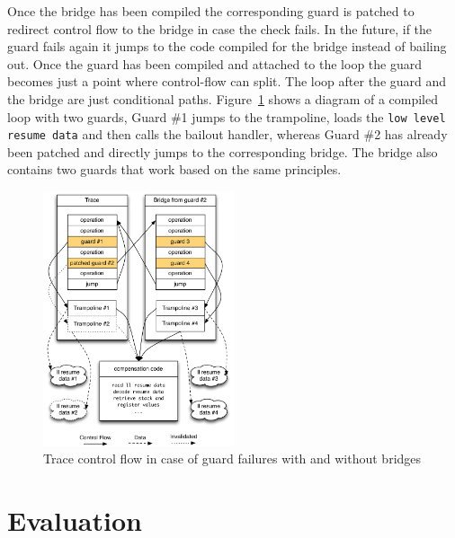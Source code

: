 \documentclass[10pt,preprint]{sigplanconf}
\begin{document}
Once the bridge has been compiled the corresponding guard is
patched to redirect control flow to the bridge in case the check fails. In
the future, if the guard fails again it jumps to the code compiled for the bridge
instead of bailing out. Once the guard has been compiled and attached to the
loop the guard becomes just a point where control-flow can split. The loop
after the guard and the bridge are just conditional paths.
Figure~\ref{fig:trampoline} shows a diagram of a compiled loop with two guards,
Guard \#1 jumps to the trampoline, loads the \texttt{low level resume data} and
then calls the bailout handler, whereas Guard \#2 has already been patched
and directly jumps to the corresponding bridge. The bridge also contains two
guards that work based on the same principles.
\begin{figure}
\centering
\includegraphics[width=0.5\textwidth]{figures/loop_bridge.pdf}
\caption{Trace control flow in case of guard failures with and without bridges}
\label{fig:trampoline}
\end{figure}



\section{Evaluation}
\label{sec:evaluation}
\end{document}
